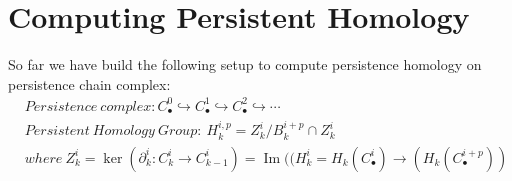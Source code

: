 \documentclass[11pt,a4paper]{report}
\DeclareMathOperator{\Ima}{Im}
\begin{document}



              
              
              
            \chapter{Computing Persistent Homology}\label{chapter4}

            So far we have build the following setup to compute persistence homology on persistence chain complex:
              \begin{align*}
                &Persistence \ complex: C_\bullet^0 \hookrightarrow C_\bullet^1 \hookrightarrow C_\bullet^2 \hookrightarrow \cdots\\
                &Persistent \ Homology \ Group: \ H_k^{i,p} = Z_k^i / B_k^{i+p} \cap Z_k^i\\
                & where \ Z_k^i = \ker (\partial_k^i : C_k^i \rightarrow C_{k-1}^i)
                =\Ima ((H_k^i = H_k ( C_\bullet^i) \rightarrow (H_k ( C_\bullet^{i+p}))\\
              \end{align*}
              
\end{document}
